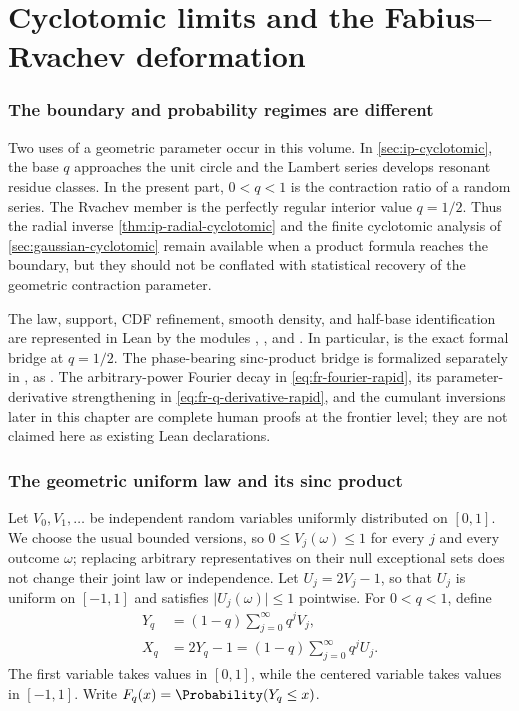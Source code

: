 \part{Cyclotomic limits and the Fabius--Rvachev deformation}

\section{The boundary and probability regimes are different}
\label{sec:cyclotomic-fabius-interface}

Two uses of a geometric parameter occur in this volume.  In
\cref{sec:ip-cyclotomic}, the base \(q\) approaches the unit circle and the
Lambert series develops resonant residue classes.  In the present part,
\(0<q<1\) is the contraction ratio of a random series.  The Rvachev member is
the perfectly regular interior value \(q=1/2\).  Thus the radial inverse
\cref{thm:ip-radial-cyclotomic} and the finite cyclotomic analysis of
\cref{sec:gaussian-cyclotomic} remain available when a product formula reaches
the boundary, but they should not be conflated with statistical recovery of
the geometric contraction parameter.

The law, support, CDF refinement, smooth density, and half-base
identification are represented in Lean by the modules
,
, and
.  In particular,
 is the exact formal bridge
at \(q=1/2\).  The phase-bearing sinc-product bridge is formalized separately
in , as
.
The arbitrary-power Fourier decay in \cref{eq:fr-fourier-rapid}, its
parameter-derivative strengthening in \cref{eq:fr-q-derivative-rapid}, and the
cumulant inversions later in this chapter are complete human proofs at the
frontier level; they are not claimed here as existing Lean declarations.

\section{The geometric uniform law and its sinc product}
\label{sec:fr-geometric-law}

Let \(V_0,V_1,\ldots\) be independent random variables uniformly distributed
on \([0,1]\).  We choose the usual bounded versions, so
\(0\le V_j(\omega)\le1\) for every \(j\) and every outcome \(\omega\);
replacing arbitrary representatives on their null exceptional sets does not
change their joint law or independence.  Let \(U_j=2V_j-1\), so that \(U_j\)
is uniform on \([-1,1]\) and satisfies \(\lvert U_j(\omega)\rvert\le1\)
pointwise.  For \(0<q<1\), define
\begin{align}
 Y_q&=(1-q)\sum_{j=0}^{\infty}q^jV_j,\label{eq:fr-Y}\\
 X_q&=2Y_q-1=(1-q)\sum_{j=0}^{\infty}q^jU_j.\label{eq:fr-X}
\end{align}
The first variable takes values in \([0,1]\), while the centered variable
takes values in \([-1,1]\).  Write \(F_q(x)=\Probability(Y_q\le x)\).

